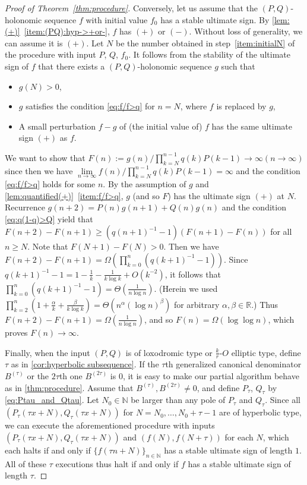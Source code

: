 \documentclass[a4paper,UKenglish,cleveref,autoref,thm-restate]{lipics-v2021}
\newcommand{\R}{\mathbb{R}}
\newcommand{\N}{\mathbb{N}}
\begin{document}
\begin{proof}[Proof of Theorem~\ref{thm:procedure}]
Conversely, let us assume that the $(P, Q)$-holonomic sequence $f$ with initial value $f_0$ has a stable ultimate sign. 
By \cref{lem:(+)}~\eqref{item:(PQ):hyp->+or-}, $f$ has $(+)$ or $(-)$. Without loss of generality, we can assume it is $(+)$. 
Let $N$ be the number obtained in step~\ref{item:initialN} of the procedure with input $P$, $Q$, $f_0$. 
It follows from the stability of the ultimate sign of $f$ that there exists a $(P, Q)$-holonomic sequence $g$ such that 
\begin{itemize}
\item $g(N) > 0$,
\item $g$ satisfies the condition \eqref{eq:f/f>q} for $n=N$, where $f$ is replaced by $g$,
\item A small perturbation $f-g$ of (the initial value of) $f$ has the same ultimate sign $(+)$ as $f$. 
\end{itemize}
We want to show that $F(n) := g(n) / \prod_{k=N}^{n-1}q(k)P(k-1) \to \infty (n \to \infty)$ since then we have $\lim\limits_{n \to \infty} f(n) / \prod_{k=N}^{n-1}q(k)P(k-1) = \infty$ and the condition \eqref{eq:f/f>q} holds for some $n$. By the assumption of $g$ and \cref{lem:quantified(+)}~\eqref{item:f/f>q}, $g$ (and so $F$) has the ultimate sign $(+)$ at $N$. Recurrence $g(n+2) = P(n)g(n+1) + Q(n)g(n)$ and the condition \eqref{eq:q(1-q)>Q} yield that $F(n+2) - F(n+1) \geq (q(n+1)^{-1} - 1) (F(n+1) - F(n))$ for all $n \geq N$. Note that $F(N+1) - F(N) > 0$. Then we have $F(n+2) - F(n+1) = \Omega \left( \prod_{k=0}^{n} (q(k+1)^{-1} - 1) \right) $. 
Since $q(k+1)^{-1} - 1 = 1 - \frac1k - \frac1{k \log k} + O(k^{-2})$, it follows that $\prod_{k=0}^{n} (q(k+1)^{-1} - 1) = \Theta\left( \frac1{n \log n} \right)$. (Herein we used $\prod_{k=2}^n (1 + \frac{\alpha}k + \frac{\beta}{k \log k}) = \Theta(n^{\alpha}(\log n)^{\beta})$ for arbitrary $\alpha, \beta \in \R$.) Thus $F(n+2) - F(n+1) = \Omega\left( \frac1{n \log n} \right)$, and so $F(n) = \Omega(\log\log n)$, which proves $F(n) \to \infty$. 

Finally, when the input $(P, Q)$ is of loxodromic type or $\frac{k}r$-$O$ elliptic type, define $\tau$ as in \cref{cor:hyperbolic subsequence}. If the $\tau$th generalized canonical denominator $B^{(\tau)}$ or the $2\tau$th one $B^{(2\tau)}$ is $0$, it is easy to make our partial algorithm behave as in \cref{thm:procedure}. 
Assume that $B^{(\tau)}, B^{(2\tau)} \neq 0$, and define $P_{\tau}$, $Q_{\tau}$ by \eqref{eq:Ptau_and_Qtau}. Let $N_0 \in \N$ be larger than any pole of $P_{\tau}$ and $Q_{\tau}$. Since all $(P_{\tau}(\tau x + N), Q_{\tau}(\tau x + N))$ for $N=N_0, \dots, N_0 + \tau -1$ are of hyperbolic type, we can execute the aforementioned procedure with inputs $(P_{\tau}(\tau x + N), Q_{\tau}(\tau x + N))$ and $(f(N), f(N+\tau))$ for each $N$,
which each halts if and only if 
$\{ f( \tau n + N ) \}_{n \in \N}$ has a stable ultimate sign of length $1$.
All of these $\tau$ executions thus halt if and only if $f$ has a stable ultimate sign of length $\tau$.
\end{proof}
\end{document}
